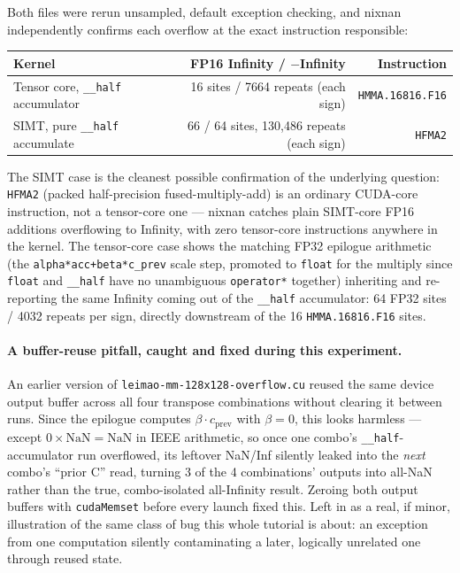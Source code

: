 \documentclass[11pt]{article}
\begin{document}
Both files were rerun unsampled, default exception checking, and nixnan
independently confirms each overflow at the exact instruction responsible:

\begin{center}
\small
\begin{tabular}{lrr}
\toprule
Kernel & FP16 Infinity / $-$Infinity & Instruction \\
\midrule
Tensor core, \texttt{\_\_half} accumulator & 16 sites / 7664 repeats (each sign) & \texttt{HMMA.16816.F16} \\
SIMT, pure \texttt{\_\_half} accumulate & 66 / 64 sites, 130{,}486 repeats (each sign) & \texttt{HFMA2} \\
\bottomrule
\end{tabular}
\end{center}

The SIMT case is the cleanest possible confirmation of the underlying
question: \texttt{HFMA2} (packed half-precision fused-multiply-add) is an
ordinary CUDA-core instruction, not a tensor-core one --- nixnan catches
plain SIMT-core FP16 additions overflowing to Infinity, with zero
tensor-core instructions anywhere in the kernel. The tensor-core case shows
the matching FP32 epilogue arithmetic (the \texttt{alpha*acc+beta*c\_prev}
scale step, promoted to \texttt{float} for the multiply since \texttt{float}
and \texttt{\_\_half} have no unambiguous \texttt{operator*} together)
inheriting and re-reporting the same Infinity coming out of the
\texttt{\_\_half} accumulator: 64 FP32 sites / 4032 repeats per sign,
directly downstream of the 16 \texttt{HMMA.16816.F16} sites.

\paragraph{A buffer-reuse pitfall, caught and fixed during this experiment.}
An earlier version of \texttt{leimao-mm-128x128-overflow.cu} reused the same
device output buffer across all four transpose combinations without
clearing it between runs. Since the epilogue computes $\beta \cdot
c_{\mathrm{prev}}$ with $\beta{=}0$, this looks harmless --- except
$0 \times \mathrm{NaN} = \mathrm{NaN}$ in IEEE arithmetic, so once one combo's
\texttt{\_\_half}-accumulator run overflowed, its leftover NaN/Inf silently
leaked into the \emph{next} combo's ``prior C'' read, turning 3 of the 4
combinations' outputs into all-NaN rather than the true, combo-isolated
all-Infinity result. Zeroing both output buffers with \texttt{cudaMemset}
before every launch fixed this. Left in as a real, if minor, illustration
of the same class of bug this whole tutorial is about: an exception from
one computation silently contaminating a later, logically unrelated one
through reused state.
\end{document}
